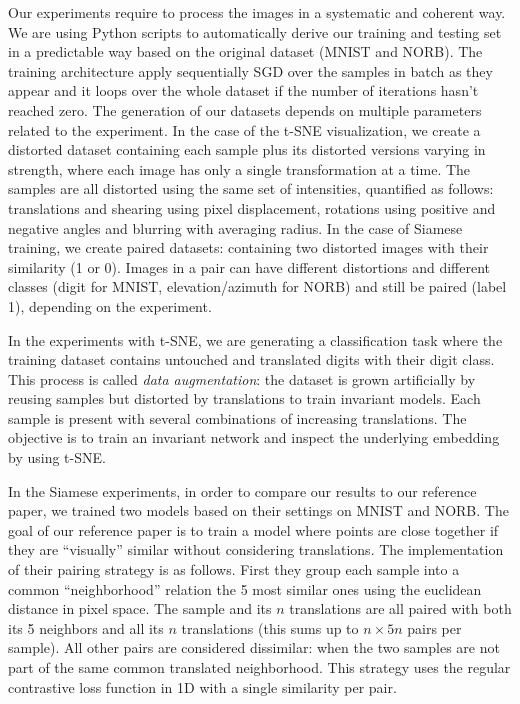 \documentclass[a4paper,12pt]{report}
\begin{document}
Our experiments require to process the images in a systematic and coherent way.
We are using Python scripts to automatically derive our training and testing set in a predictable way based on the original dataset (MNIST and NORB).
The training architecture apply sequentially SGD over the samples in batch as they appear and it loops over the whole dataset if the number of iterations hasn't reached zero.
The generation of our datasets depends on multiple parameters related to the experiment.
In the case of the t-SNE visualization, we create a distorted dataset containing each sample plus its distorted versions varying in strength, where each image has only a single transformation at a time.
The samples are all distorted using the same set of intensities, quantified as follows: translations and shearing using pixel displacement, rotations using positive and negative angles and blurring with averaging radius.
In the case of Siamese training, we create paired datasets: containing two distorted images with their similarity (1 or 0).
Images in a pair can have different distortions and different classes (digit for MNIST, elevation/azimuth for NORB) and still be paired (label 1), depending on the experiment.

In the experiments with t-SNE, we are generating a classification task where the training dataset contains untouched and translated digits with their digit class.
This process is called {\em data augmentation}: the dataset is grown artificially by reusing samples but distorted by translations to train invariant models.
Each sample is present with several combinations of increasing translations.
The objective is to train an invariant network and inspect the underlying embedding by using t-SNE.

In the Siamese experiments, in order to compare our results to our reference paper, we trained two models based on their settings on MNIST and NORB.
The goal of our reference paper is to train a model where points are close together if they are ``visually'' similar without considering translations.
The implementation of their pairing strategy is as follows.
First they group each sample into a common ``neighborhood'' relation the 5 most similar ones using the euclidean distance in pixel space.
The sample and its $n$ translations are all paired with both its 5 neighbors and all its $n$ translations (this sums up to $n \times 5n$ pairs per sample).
All other pairs are considered dissimilar: when the two samples are not part of the same common translated neighborhood.
This strategy uses the regular contrastive loss function in 1D with a single similarity per pair.
\end{document}
